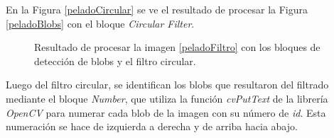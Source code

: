 En la Figura \ref{peladoCircular} se ve el resultado de procesar la Figura \ref{peladoBlobs} con el bloque \emph{Circular Filter}.

\begin{figure}[H]
       \hspace{-1cm}
        \hspace{3 mm}
  \caption{Resultado de procesar la imagen \ref{peladoFiltro} con los bloques de detección de blobs y el filtro circular.}
      \label{ejemplocircularfilter}
\end{figure}

Luego del filtro circular, se identifican los blobs que resultaron del filtrado mediante el bloque \emph{Number}, que utiliza la función \emph{cvPutText} de la librería  \emph{OpenCV} para numerar cada blob de la imagen con su número de \textit{id}. Esta numeración se hace de izquierda a derecha y de arriba hacia abajo.\\


